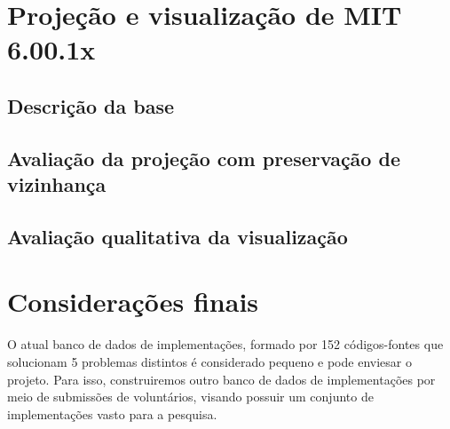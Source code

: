 	
	
	\section{Projeção e visualização de MIT 6.00.1x}	

	\subsection{Descrição da base}
	
	

\subsection{Avaliação da projeção com preservação de vizinhança}


\subsection{Avaliação qualitativa da visualização}



	\section{Considerações finais}
	
		O atual banco de dados de implementações, formado por 152 códigos-fontes que
		solucionam 5 problemas distintos é considerado pequeno e pode enviesar o
		projeto. Para isso, construiremos outro banco de dados de implementações
		por meio de submissões de voluntários, visando possuir um conjunto de
		implementações vasto para a pesquisa.
